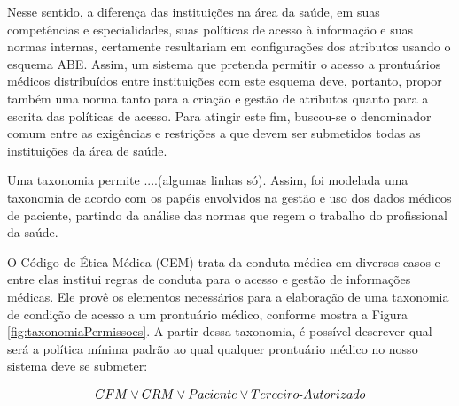 \documentclass[a4paper,11pt]{article}
\begin{document}
Nesse sentido, a diferença das instituições na área da saúde, em suas competências e especialidades,  suas políticas de acesso à informação e suas normas internas, certamente resultariam em configurações dos atributos usando o esquema ABE.
Assim, um sistema que pretenda permitir o acesso a prontuários médicos distribuídos entre instituições com este esquema deve, portanto, propor também uma norma tanto para a criação e gestão de atributos quanto para a escrita das políticas de acesso.
Para atingir este fim, buscou-se o denominador comum entre as exigências e restrições a que devem ser submetidos todas as instituições da área de saúde.

{\color{magenta}Uma taxonomia permite ....(algumas linhas só)}. Assim, foi modelada uma taxonomia de acordo com os papéis envolvidos na gestão e uso dos dados médicos de paciente, partindo da análise das normas que regem o trabalho do profissional da saúde. %

O Código de Ética Médica (CEM) trata da conduta médica em diversos casos e entre elas institui regras de conduta para o acesso e gestão de informações médicas. Ele provê os elementos necessários para a elaboração de uma taxonomia de condição de acesso a um prontuário médico, conforme mostra a Figura \ref{fig:taxonomiaPermissoes}. %
A partir dessa taxonomia, é possível descrever qual será a política mínima padrão ao qual qualquer prontuário médico {\color{blue}no nosso sistema} deve se submeter:

\[ CFM \vee CRM \vee Paciente \vee Terceiro\textnormal{-}Autorizado \]



\end{document}
